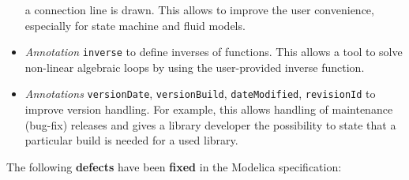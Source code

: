 \begin{itemize}
  a connection line is drawn. This allows to improve the user
  convenience, especially for state machine and fluid models.
\item
  \emph{Annotation} \lstinline!inverse! to define inverses of functions. This
  allows a tool to solve non-linear algebraic loops by using the
  user-provided inverse function.
\item
  \emph{Annotations} \lstinline!versionDate!, \lstinline!versionBuild!,
  \lstinline!dateModified!, \lstinline!revisionId! to improve version handling. For
  example, this allows handling of maintenance (bug-fix) releases and
  gives a library developer the possibility to state that a particular
  build is needed for a used library.
\end{itemize}

The following \textbf{defects} have been \textbf{fixed} in the Modelica
specification:

